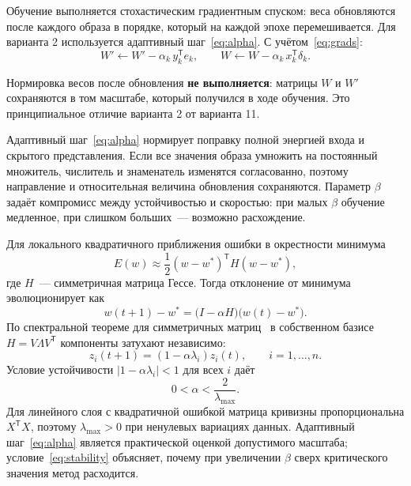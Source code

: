 Обучение выполняется стохастическим градиентным спуском: веса обновляются после каждого образа в порядке, который на каждой эпохе перемешивается. Для варианта 2 используется адаптивный шаг~\eqref{eq:alpha}. С учётом~\eqref{eq:grads}:
\begin{equation}
	W' \leftarrow W' - \alpha_k\, y_k^{\mathsf{T}} e_k,
	\qquad
	W \leftarrow W - \alpha_k\, x_k^{\mathsf{T}} \delta_k .
	\label{eq:update}
\end{equation}

Нормировка весов после обновления \textbf{не выполняется}: матрицы $W$ и $W'$ сохраняются в том масштабе, который получился в ходе обучения. Это принципиальное отличие варианта 2 от варианта 11.

Адаптивный шаг~\eqref{eq:alpha} нормирует поправку полной энергией входа и скрытого представления. Если все значения образа умножить на постоянный множитель, числитель и знаменатель изменятся согласованно, поэтому направление и относительная величина обновления сохраняются. Параметр $\beta$ задаёт компромисс между устойчивостью и скоростью: при малых $\beta$ обучение медленное, при слишком больших~--- возможно расхождение.

Для локального квадратичного приближения ошибки в окрестности минимума
\begin{equation}
	E(w) \approx \frac{1}{2}(w-w^*)^{\mathsf{T}} H (w-w^*),
\end{equation}
где $H$~--- симметричная матрица Гессе. Тогда отклонение от минимума эволюционирует как
\begin{equation}
	w(t+1)-w^* = \bigl(I-\alpha H\bigr)\bigl(w(t)-w^*\bigr).
\end{equation}
По спектральной теореме для симметричных матриц~\cite{gantmacher} в собственном базисе $H=V\Lambda V^{\mathsf{T}}$ компоненты затухают независимо:
\begin{equation}
	z_i(t+1) = (1-\alpha\lambda_i)z_i(t), \qquad i=1,\ldots,n.
	\label{eq:eigen}
\end{equation}
Условие устойчивости $|1-\alpha\lambda_i|<1$ для всех $i$ даёт
\begin{equation}
	0 < \alpha < \frac{2}{\lambda_{\max}} .
	\label{eq:stability}
\end{equation}
Для линейного слоя с квадратичной ошибкой матрица кривизны пропорциональна $X^{\mathsf{T}}X$, поэтому $\lambda_{\max}>0$ при ненулевых вариациях данных. Адаптивный шаг~\eqref{eq:alpha} является практической оценкой допустимого масштаба; условие~\eqref{eq:stability} объясняет, почему при увеличении $\beta$ сверх критического значения метод расходится.

